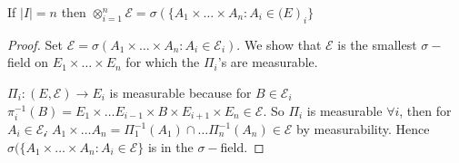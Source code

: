 \documentclass[../main.tex]{subfiles}
\begin{document}
\begin{proposition}
    If $|I| = n$ then $\otimes _{i=1}^n \mathcal{E} = \sigma(\{ A_1 \times \ldots \times A_n \colon A_i \in
    \mathcal(E)_i \} $
\end{proposition}
\begin{proof}
  Set $\mathcal{E} = \sigma(A_1\times \ldots \times A_n \colon A_i \in \mathcal{E}_i)$. We show
that $\mathcal{E}$ is the smallest $\sigma-$field on $E_1 \times \ldots \times E_n$ for which
the $\Pi_i$'s are measurable.

$\Pi_i \colon (E, \mathcal{E}) \to E_i$ is measurable because for $B \in \mathcal{E}_i$
$\pi_{i}^{-1}(B) = E_1 \times \ldots E_{i -1} \times B \times E_{i+1} \times E_n \in
\mathcal{E}$. So $\Pi_i$ is measurable $\forall i$, then for $A_i \in \mathcal{E_i}$ $A_1
\times \ldots A_n = \Pi_{1}^{-1}(A_1) \cap \ldots \Pi_n^{-1}(A_n) \in \mathcal{E}$ by
measurability. Hence $\sigma(\{ A_1 \times \ldots \times A_n \colon A_i \in \mathcal{E} \} $ is
in the $\sigma-$field.
\end{proof}
\end{document}
